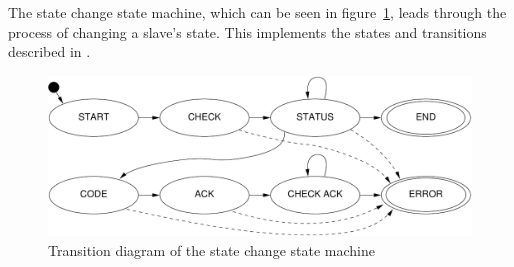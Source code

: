 \documentclass[a4paper,12pt,BCOR6mm,bibtotoc,idxtotoc]{scrbook}
\begin{document}
The state change state machine, which can be seen in
figure~\ref{fig:fsm-change}, leads through the process of changing a
slave's state. This implements the states and transitions described in
\cite[section~6.4.1]{alspec}.

\begin{figure}[htbp]
  \centering
  \includegraphics[width=.9\textwidth]{images/fsm-change}
  \caption{Transition diagram of the state change state machine}
  \label{fig:fsm-change}
\end{figure}
\end{document}
